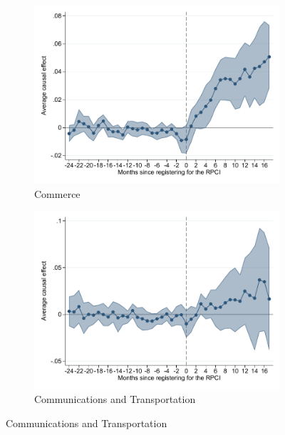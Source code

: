 \documentclass[oneside,11pt]{article}
\begin{document}
\begin{figure}[H]
\begin{center}
    \begin{subfigure}{0.49\textwidth}
    \caption{Commerce}
    \includegraphics[width=\textwidth]{04_Figures/muestra_10porciento/event_study_log_sal_cierre_chaisemartin_div_final_6.pdf}
    \end{subfigure}
    \begin{subfigure}{0.49\textwidth}
    \caption{Communications and Transportation}
    \includegraphics[width=\textwidth]{04_Figures/muestra_10porciento/event_study_log_sal_cierre_chaisemartin_div_final_7.pdf}
    \end{subfigure}
    
    \end{center}
\end{figure}
\end{document}
